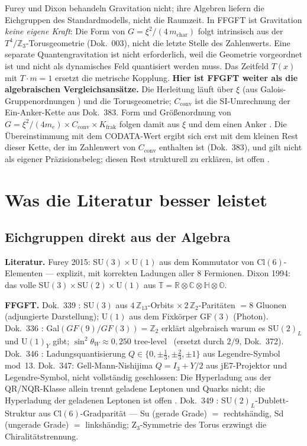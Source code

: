 Furey und Dixon behandeln Gravitation nicht; ihre Algebren liefern die
Eichgruppen des Standardmodells, nicht die Raumzeit. In FFGFT ist Gravitation
\emph{keine eigene Kraft}: Die Form von $G = \xi^2/(4\,m_\text{char})$ folgt intrinsisch
aus der $T^4/\mathbb{Z}_3$-Torusgeometrie (Dok.~003), nicht die letzte Stelle des
Zahlenwerts. Eine
separate Quantengravitation ist nicht erforderlich, weil die Geometrie
vorgeordnet ist und nicht als dynamisches Feld quantisiert werden muss.
Das Zeitfeld $T(x)$ mit $T \cdot m = 1$ ersetzt die metrische Kopplung.
\textbf{Hier ist FFGFT weiter als die algebraischen Vergleichsansätze.}
Die Herleitung läuft über $\xi$ (aus Galois-Gruppenordnungen \KM) und die
Torusgeometrie; $C_\text{conv}$ ist die SI-Umrechnung der Ein-Anker-Kette aus
Dok.~383. Form und Größenordnung von
$G = \xi^2/(4m_e)\times C_\text{conv}\times K_\text{frak}$ folgen damit aus $\xi$
und dem einen Anker \KM. Die Übereinstimmung mit dem CODATA-Wert ergibt sich erst
mit dem kleinen Rest dieser Kette, der im Zahlenwert von $C_\text{conv}$ enthalten
ist (Dok.~383), und gilt nicht als eigener Präzisionsbeleg; diesen Rest strukturell
zu erklären, ist offen \SM.

\section{Was die Literatur besser leistet}

\subsection{Eichgruppen direkt aus der Algebra}

\textbf{Literatur.}
Furey 2015: SU$(3)\times$U$(1)$ aus dem Kommutator von Cl$(6)$-Elementen ---
explizit, mit korrekten Ladungen aller 8 Fermionen.
Dixon 1994: das volle SU$(3)\times$SU$(2)\times$U$(1)$ aus
$\mathbb{T}=\mathbb{R}\otimes\mathbb{C}\otimes\mathbb{H}\otimes\mathbb{O}$.

\textbf{FFGFT.}
Dok.~339 \BM: SU$(3)$ aus $4\,\mathbb{Z}_{13}$-Orbits $\times\,2\,\mathbb{Z}_2$-Paritäten
$=8$ Gluonen (adjungierte Darstellung); U$(1)$ aus dem Fixkörper GF$(3)$ (Photon).
Dok.~336 \BM: Gal$(GF(9)/GF(3))=\mathbb{Z}_2$ erklärt algebraisch warum es
SU$(2)_L$ und U$(1)_Y$ gibt; $\sin^2\theta_W\approx0{,}250$ tree-level \XM\ (ersetzt durch $2/9$, Dok.~372).
Dok.~346 \BM: Ladungsquantisierung $Q\in\{0,\pm\tfrac{1}{3},\pm\tfrac{2}{3},\pm1\}$
aus Legendre-Symbol mod~13.
Dok.~347: Gell-Mann-Nishijima $Q=I_3+Y/2$ aus jE7-Projektor und Legendre-Symbol,
nicht vollständig geschlossen: Die Hyperladung aus der QR/NQR-Klasse allein trennt
geladene Leptonen und Quarks nicht; die Hyperladung der geladenen Leptonen ist offen \SM.
Dok.~349 \BM: SU$(2)_L$-Dublett-Struktur aus Cl$(6)$-Gradparität ---
Su (gerade Grade) $=$ rechtshändig, Sd (ungerade Grade) $=$ linkshändig;
Z$_3$-Symmetrie des Torus erzwingt die Chiralitätstrennung.

